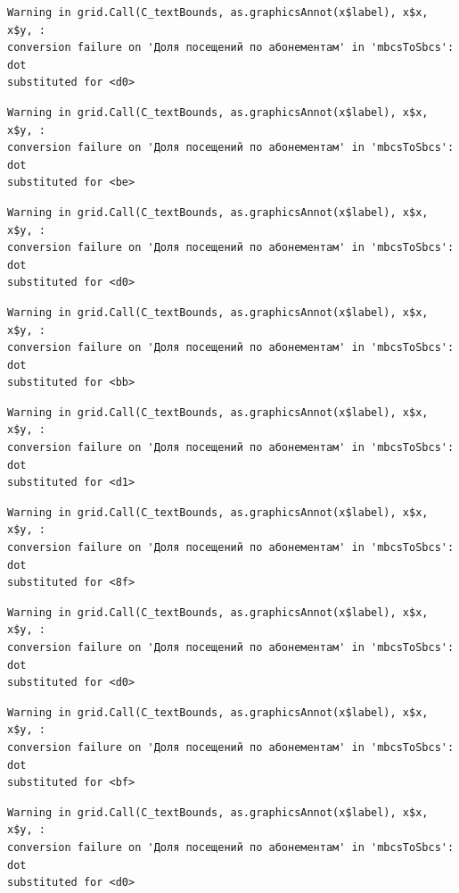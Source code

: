 \documentclass[
  letterpaper,
  DIV=11,
  numbers=noendperiod]{scrartcl}
\begin{document}
\begin{verbatim}
Warning in grid.Call(C_textBounds, as.graphicsAnnot(x$label), x$x, x$y, :
conversion failure on 'Доля посещений по абонементам' in 'mbcsToSbcs': dot
substituted for <d0>
\end{verbatim}

\begin{verbatim}
Warning in grid.Call(C_textBounds, as.graphicsAnnot(x$label), x$x, x$y, :
conversion failure on 'Доля посещений по абонементам' in 'mbcsToSbcs': dot
substituted for <be>
\end{verbatim}

\begin{verbatim}
Warning in grid.Call(C_textBounds, as.graphicsAnnot(x$label), x$x, x$y, :
conversion failure on 'Доля посещений по абонементам' in 'mbcsToSbcs': dot
substituted for <d0>
\end{verbatim}

\begin{verbatim}
Warning in grid.Call(C_textBounds, as.graphicsAnnot(x$label), x$x, x$y, :
conversion failure on 'Доля посещений по абонементам' in 'mbcsToSbcs': dot
substituted for <bb>
\end{verbatim}

\begin{verbatim}
Warning in grid.Call(C_textBounds, as.graphicsAnnot(x$label), x$x, x$y, :
conversion failure on 'Доля посещений по абонементам' in 'mbcsToSbcs': dot
substituted for <d1>
\end{verbatim}

\begin{verbatim}
Warning in grid.Call(C_textBounds, as.graphicsAnnot(x$label), x$x, x$y, :
conversion failure on 'Доля посещений по абонементам' in 'mbcsToSbcs': dot
substituted for <8f>
\end{verbatim}

\begin{verbatim}
Warning in grid.Call(C_textBounds, as.graphicsAnnot(x$label), x$x, x$y, :
conversion failure on 'Доля посещений по абонементам' in 'mbcsToSbcs': dot
substituted for <d0>
\end{verbatim}

\begin{verbatim}
Warning in grid.Call(C_textBounds, as.graphicsAnnot(x$label), x$x, x$y, :
conversion failure on 'Доля посещений по абонементам' in 'mbcsToSbcs': dot
substituted for <bf>
\end{verbatim}

\begin{verbatim}
Warning in grid.Call(C_textBounds, as.graphicsAnnot(x$label), x$x, x$y, :
conversion failure on 'Доля посещений по абонементам' in 'mbcsToSbcs': dot
substituted for <d0>
\end{verbatim}
\end{document}
